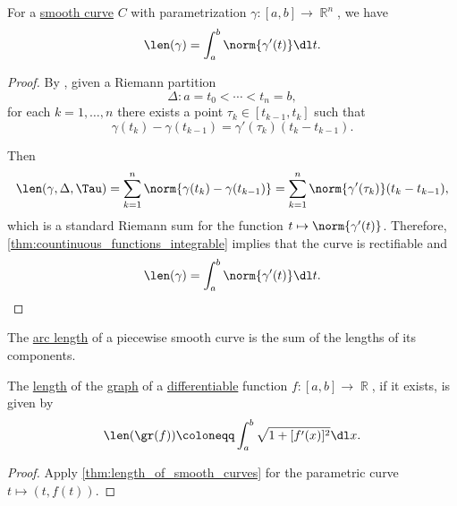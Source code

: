 \begin{proposition}\label{thm:length_of_smooth_curves}
  For a \hyperref[def:smooth_curve]{smooth curve} \( C \) with parametrization \( \gamma: [a, b] \to \BbbR^n \), we have
  \begin{equation*}
    \len(\gamma) = \int_a^b \norm{\gamma'(t)} \dl t.
  \end{equation*}
\end{proposition}
\begin{proof}
  By , given a Riemann partition
  \begin{equation*}
    \Delta: a = t_0 < \cdots < t_n = b,
  \end{equation*}
  for each \( k = 1, \ldots, n \) there exists a point \( \tau_k \in [t_{k-1}, t_k] \) such that
  \begin{equation*}
    \gamma(t_k) - \gamma(t_{k-1}) = \gamma'(\tau_k) (t_k - t_{k-1}).
  \end{equation*}

  Then
  \begin{equation*}
    \len(\gamma, \Delta, \Tau)
    =
    \sum_{k=1}^n \norm{\gamma(t_k) - \gamma(t_{k-1})}
    =
    \sum_{k=1}^n \norm{\gamma'(\tau_k)} (t_k - t_{k-1}),
  \end{equation*}
  which is a standard Riemann sum for the function \( t \mapsto \norm{\gamma'(t)} \). Therefore, \cref{thm:countinuous_functions_integrable} implies that the curve is rectifiable and
  \begin{equation*}
    \len(\gamma) = \int_a^b \norm{\gamma'(t)} \dl t.
  \end{equation*}
\end{proof}

\begin{corollary}\label{thm:length_of_piecewise_smooth_curves}
  The \hyperref[def:arc_length]{arc length} of a piecewise smooth curve is the sum of the lengths of its components.
\end{corollary}

\begin{corollary}\label{thm:length_of_function_graph}
  The \hyperref[def:arc_length]{length} of the \hyperref[def:set_valued_function/graph]{graph} of a \hyperref[def:differentiability/frechet]{differentiable} function \( f: [a, b] \to \BbbR \), if it exists, is given by
  \begin{equation*}
    \len(\gr(f)) \coloneqq \int_a^b \sqrt{1 + [f'(x)]^2} \dl x.
  \end{equation*}
\end{corollary}
\begin{proof}
  Apply \cref{thm:length_of_smooth_curves} for the parametric curve \( t \mapsto (t, f(t)) \).
\end{proof}

